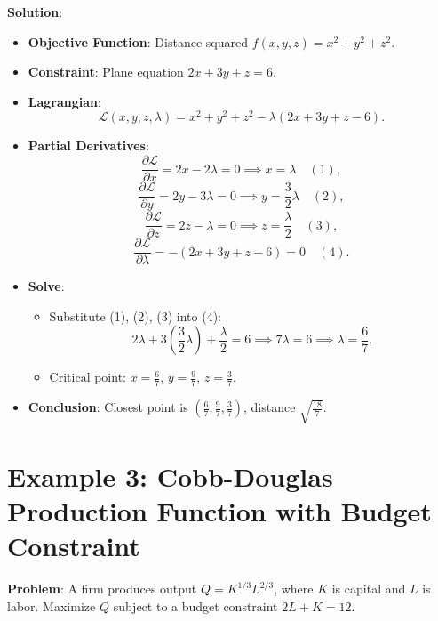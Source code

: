 \documentclass{article}
\begin{document}
\textbf{Solution}:
\begin{itemize}
    \item \textbf{Objective Function}: Distance squared $ f(x, y, z) = x^2 + y^2 + z^2 $.
    \item \textbf{Constraint}: Plane equation $ 2x + 3y + z = 6 $.
    \item \textbf{Lagrangian}:
    \[
    \mathcal{L}(x, y, z, \lambda) = x^2 + y^2 + z^2 - \lambda (2x + 3y + z - 6).
    \]
    \item \textbf{Partial Derivatives}:
    \[
    \frac{\partial \mathcal{L}}{\partial x} = 2x - 2\lambda = 0 \implies x = \lambda \quad (1),
    \]
    \[
    \frac{\partial \mathcal{L}}{\partial y} = 2y - 3\lambda = 0 \implies y = \frac{3}{2}\lambda \quad (2),
    \]
    \[
    \frac{\partial \mathcal{L}}{\partial z} = 2z - \lambda = 0 \implies z = \frac{\lambda}{2} \quad (3),
    \]
    \[
    \frac{\partial \mathcal{L}}{\partial \lambda} = -(2x + 3y + z - 6) = 0 \quad (4).
    \]
    \item \textbf{Solve}:
    \begin{itemize}
        \item Substitute (1), (2), (3) into (4):
        \[
        2\lambda + 3\left(\frac{3}{2}\lambda\right) + \frac{\lambda}{2} = 6 \implies 7\lambda = 6 \implies \lambda = \frac{6}{7}.
        \]
        \item Critical point: $ x = \frac{6}{7} $, $ y = \frac{9}{7} $, $ z = \frac{3}{7} $.
    \end{itemize}
    \item \textbf{Conclusion}: Closest point is $ \left( \frac{6}{7}, \frac{9}{7}, \frac{3}{7} \right) $, distance $ \sqrt{\frac{18}{7}} $.
\end{itemize}

\section*{Example 3: Cobb-Douglas Production Function with Budget Constraint}

\textbf{Problem}: A firm produces output $ Q = K^{1/3} L^{2/3} $, where $ K $ is capital and $ L $ is labor. Maximize $ Q $ subject to a budget constraint $ 2L + K = 12 $. \\
\end{document}
